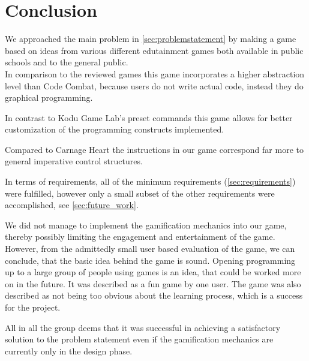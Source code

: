 \section{Conclusion}
\label{sec:report_conclusion}

We approached the main problem in \autoref{sec:problemstatement} by making a game based on ideas from various different edutainment games both available in public schools and to the general public.\\

In comparison to the reviewed games this game incorporates a higher abstraction level than Code Combat, because users do not write actual code, instead they do graphical programming.

In contrast to Kodu Game Lab's preset commands this game allows for better customization of the programming constructs implemented.

Compared to Carnage Heart the instructions in our game correspond far more to general imperative control structures. \newline

In terms of requirements, all of the minimum requirements (\autoref{sec:requirements}) were fulfilled, however only a small subset of the other requirements were accomplished, see \autoref{sec:future_work}.

We did not manage to implement the gamification mechanics into our game, thereby possibly limiting the engagement and entertainment of the game. However, from the admittedly small user based evaluation of the game, we can conclude, that the basic idea behind the game is sound. Opening programming up to a large group of people using games is an idea, that could be worked more on in the future. It was described as a fun game by one user. The game was also described as not being too obvious about the learning process, which is a success for the project.\newline

All in all the group deems that it was successful in achieving a satisfactory solution to the problem statement even if the gamification mechanics are currently only in the design phase.